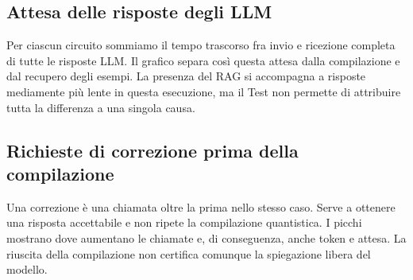 \subsection{Attesa delle risposte degli LLM}
\begingroup\small Per ciascun circuito sommiamo il tempo trascorso fra invio e ricezione completa di tutte le risposte LLM. Il grafico separa così questa attesa dalla compilazione e dal recupero degli esempi. La presenza del RAG si accompagna a risposte mediamente più lente in questa esecuzione, ma il Test non permette di attribuire tutta la differenza a una singola causa.\par\endgroup
\begin{center}

\end{center}\restoregeometry
\clearpage{}\captionsetup{hypcap=false}
\subsection{Richieste di correzione prima della compilazione}
\begingroup\small Una correzione è una chiamata oltre la prima nello stesso caso. Serve a ottenere una risposta accettabile e non ripete la compilazione quantistica. I picchi mostrano dove aumentano le chiamate e, di conseguenza, anche token e attesa. La riuscita della compilazione non certifica comunque la spiegazione libera del modello.\par\endgroup
\begin{center}

\end{center}\restoregeometry
\clearpage{}\captionsetup{hypcap=false}
